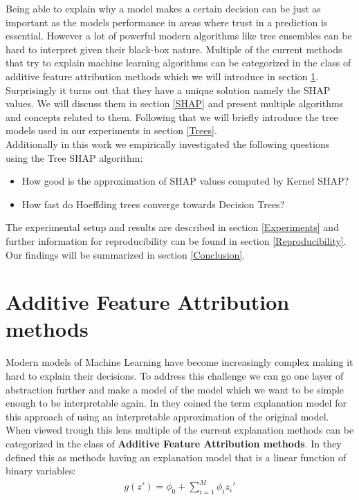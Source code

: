 \documentclass[conference]{IEEEtran}
\begin{document}
Being able to explain why a model makes a certain decision can be just as important as the models performance in areas where trust in a prediction is essential. However a lot of powerful modern algorithms like tree ensembles can be hard to interpret given their black-box nature. Multiple of the current methods that try to explain machine learning algorithms can be categorized in the class of 
additive feature attribution methods which we will introduce in section \ref{AFAM}. Surprisingly it turns out that they have a unique solution namely the SHAP values. We will discuss them in section \ref{SHAP} and present multiple algorithms and concepts related to them. Following that we will briefly introduce the tree models used in our experiments in section \ref{Trees}.\\
Additionally in this work we empirically investigated the following questions using the Tree SHAP algorithm:
\begin{itemize}
	\item How good is the approximation of SHAP values computed by Kernel SHAP?
	\item How fast do Hoeffding trees converge towards Decision Trees?
\end{itemize}
The experimental setup and results are described in section \ref{Experiments} and further information for reproducibility can be found in section \ref{Reproducibility}.
Our findings will be summarized in section \ref{Conclusion}.

\section{Additive Feature Attribution methods}
\label{AFAM}
Modern models of Machine Learning have become increasingly complex making it hard to explain their decisions.
To address this challenge we can go one layer of abstraction further and make a model of the model which we want to be simple enough to be interpretable again.
In \cite{b2} they coined the term explanation model for this approach of using an interpretable approximation of the original model.\\
When viewed trough this lens multiple of the current explanation methods can be categorized in the class of  \textbf{Additive Feature Attribution methods}. In \cite{b2} they defined this as methods having an explanation model that is a linear function of binary variables:\\

\begin{align}
	g(z') = \phi_0 + \sum_{i=1}^{M}\phi_i z_{i}'
\end{align}
\end{document}
